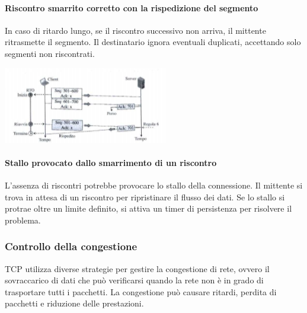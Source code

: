 \documentclass[12pt]{report}
\begin{document}
	\paragraph{Riscontro smarrito corretto con la rispedizione del segmento} In caso di ritardo lungo, se il riscontro successivo non arriva, il mittente ritrasmette il segmento. Il destinatario ignora eventuali duplicati, accettando solo segmenti non riscontrati.
	\begin{center}
		\includegraphics[scale=1.2]{assets/scenario5.png}
	\end{center}

	\paragraph{Stallo provocato dallo smarrimento di un riscontro} L’assenza di riscontri potrebbe provocare lo stallo della connessione. Il mittente si trova in attesa di un riscontro per ripristinare il flusso dei dati. Se lo stallo si protrae oltre un limite definito, si attiva un timer di persistenza per risolvere il problema.

	\subsubsection{Controllo della congestione}
	TCP utilizza diverse strategie per gestire la congestione di rete, ovvero il sovraccarico di dati che può verificarsi quando la rete non è in grado di trasportare tutti i pacchetti. La congestione può causare ritardi, perdita di pacchetti e riduzione delle prestazioni.
\end{document}
